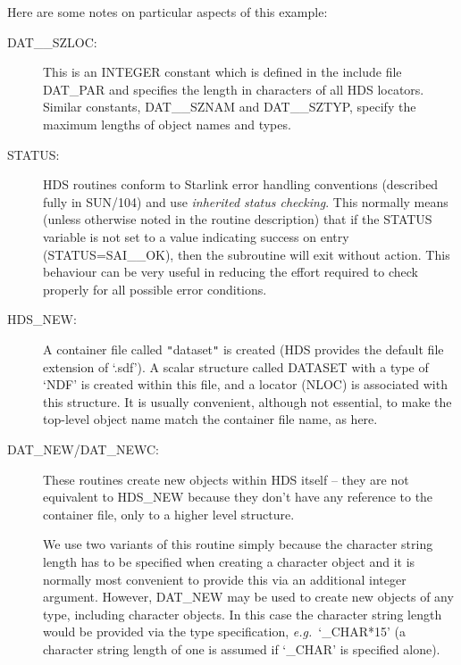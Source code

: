 \documentclass[11pt]{article}
\newcommand{\htmlref}[2]{#1}
\newcommand{\xref}[3]{#1}
\newcommand{\qt}[1]{``#1''}
\newcommand{\st}[1]{{\em{#1}}}
\newcommand{\astar}[0]{{$*$}}
\renewcommand{\qt}[1]{{\tt{"}}#1{\tt{"}}}
\renewcommand{\astar}[0]{*}
\begin{document}
Here are some notes on particular aspects of this example:

\begin{description}

\item [DAT\_\_SZLOC:]
This is an INTEGER constant which is defined in the include file
DAT\_PAR and specifies the length in characters of all HDS
\htmlref{locators}{sect:locators}. Similar constants, DAT\_\_SZNAM and DAT\_\_SZTYP, specify
the maximum lengths of object \htmlref{names}{sect:name} and
\htmlref{types}{sect:type}.

\item [STATUS:]
HDS \htmlref{routines}{appendix:alphalist} conform to Starlink error
handling conventions (described fully in \xref{SUN/104}{sun104}{}) and
use \st{inherited status checking}. This normally means (unless
otherwise noted in the routine description) that if the STATUS
variable is not set to a value indicating success on entry
(STATUS=SAI\_\_OK), then the subroutine will exit without action. This
behaviour can be very useful in reducing the effort required to check
properly for all possible error conditions.

\item [\htmlref{HDS\_NEW}{HDS_NEW}:]
A container file called \qt{dataset} is created (HDS provides the
default file extension of `.sdf'). A scalar structure called DATASET
with a type of `NDF' is created within this file, and a locator (NLOC)
is associated with this structure. It is usually convenient, although
not essential, to make the top-level object name match the container
file name, as here.

\item [\htmlref{DAT\_NEW}{DAT_NEW}/\htmlref{DAT\_NEWC}{DAT_NEWC}:]
These routines create new objects within HDS itself -- they are not
equivalent to \htmlref{HDS\_NEW}{HDS_NEW} because they don't have any
reference to the container file, only to a higher level structure.

We use two variants of this routine simply because the character
string length has to be specified when creating a character object and
it is normally most convenient to provide this via an additional
integer argument.  However, DAT\_NEW may be used to create new objects
of any type, including character objects. In this case the character
string length would be provided via the type specification, \st{e.g.}\
`\_CHAR{\astar}15' (a character string length of one is assumed if
`\_CHAR' is specified alone).


\end{description}
\end{document}
